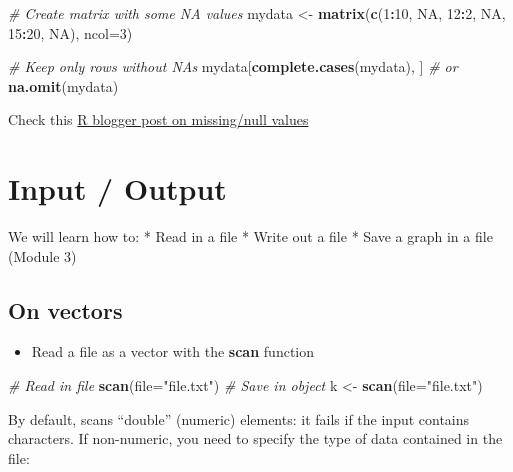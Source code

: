 \documentclass[]{book}
\newenvironment{Shaded}{\begin{snugshade}}{\end{snugshade}}
\newcommand{\CommentTok}[1]{\textcolor[rgb]{0.56,0.35,0.01}{\textit{#1}}}
\newcommand{\DataTypeTok}[1]{\textcolor[rgb]{0.13,0.29,0.53}{#1}}
\newcommand{\DecValTok}[1]{\textcolor[rgb]{0.00,0.00,0.81}{#1}}
\newcommand{\KeywordTok}[1]{\textcolor[rgb]{0.13,0.29,0.53}{\textbf{#1}}}
\newcommand{\NormalTok}[1]{#1}
\newcommand{\OperatorTok}[1]{\textcolor[rgb]{0.81,0.36,0.00}{\textbf{#1}}}
\newcommand{\OtherTok}[1]{\textcolor[rgb]{0.56,0.35,0.01}{#1}}
\newcommand{\StringTok}[1]{\textcolor[rgb]{0.31,0.60,0.02}{#1}}
\providecommand{\tightlist}{%
  \setlength{\itemsep}{0pt}\setlength{\parskip}{0pt}}
\begin{document}
\begin{Shaded}
\begin{Highlighting}[]
\CommentTok{# Create matrix with some NA values}
\NormalTok{mydata <-}\StringTok{ }\KeywordTok{matrix}\NormalTok{(}\KeywordTok{c}\NormalTok{(}\DecValTok{1}\OperatorTok{:}\DecValTok{10}\NormalTok{, }\OtherTok{NA}\NormalTok{, }\DecValTok{12}\OperatorTok{:}\DecValTok{2}\NormalTok{, }\OtherTok{NA}\NormalTok{, }\DecValTok{15}\OperatorTok{:}\DecValTok{20}\NormalTok{, }\OtherTok{NA}\NormalTok{), }\DataTypeTok{ncol=}\DecValTok{3}\NormalTok{)}

\CommentTok{# Keep only rows without NAs}
\NormalTok{mydata[}\KeywordTok{complete.cases}\NormalTok{(mydata), ]}
\CommentTok{# or}
\KeywordTok{na.omit}\NormalTok{(mydata)}
\end{Highlighting}
\end{Shaded}

Check this \href{https://www.r-bloggers.com/r-null-values-null-na-nan-inf/}{R blogger post on missing/null values}

\hypertarget{input-output}{%
\chapter{Input / Output}\label{input-output}}

We will learn how to:
* Read in a file
* Write out a file
* Save a graph in a file (Module 3)

\hypertarget{on-vectors}{%
\section{On vectors}\label{on-vectors}}

\begin{itemize}
\tightlist
\item
  Read a file as a vector with the \textbf{scan} function
\end{itemize}

\begin{Shaded}
\begin{Highlighting}[]
\CommentTok{# Read in file}
\KeywordTok{scan}\NormalTok{(}\DataTypeTok{file=}\StringTok{"file.txt"}\NormalTok{)}
\CommentTok{# Save in  object}
\NormalTok{k <-}\StringTok{ }\KeywordTok{scan}\NormalTok{(}\DataTypeTok{file=}\StringTok{"file.txt"}\NormalTok{)}
\end{Highlighting}
\end{Shaded}

By default, scans ``double'' (numeric) elements: it fails if the input contains characters.
If non-numeric, you need to specify the type of data contained in the file:
\end{document}
